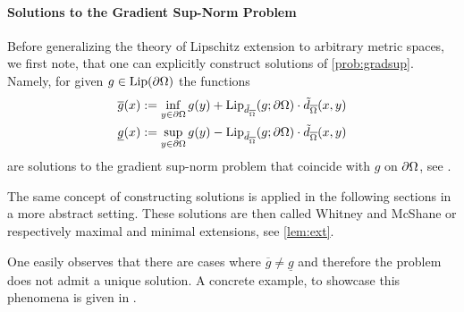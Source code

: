 \paragraph{Solutions to the Gradient Sup-Norm Problem} Before generalizing the theory of Lipschitz extension to arbitrary metric spaces, we first note, that one can explicitly construct solutions of \cref{prob:gradsup}. Namely, for given $g\in\operatorname{Lip}(\partial\Omega)$ the functions 
%
\begin{align}\label{eq:JenSol}
\begin{aligned}
\overline{g}(x) &:= \inf_{y\in\partial\domain} g(y) + 
\Lip_{\tilde{d}_{\overline{\domain}}}(g; \partial\domain)\cdot \tilde{d}_{\overline{\domain}}(x,y)\\
%
\underline{g}(x) &:= \sup_{y\in\partial\domain} g(y) - 
\Lip_{\tilde{d}_{\overline{\domain}}}(g; \partial\domain)\cdot \tilde{d}_{\overline{\domain}}(x,y)
\end{aligned}
\end{align}
%
are solutions to the gradient sup-norm problem that coincide with $g$ on $\partial\Omega$, see \cite[Th. 1.8]{jensen1993uniqueness}.
%
\begin{remark}{}{}
The same concept of constructing solutions is applied in the following sections in a more abstract setting. 
These solutions are then called Whitney and McShane or respectively maximal and minimal extensions, see 
\cref{lem:ext}.
\end{remark}
%
One easily observes that there are cases where $\overline{g}\neq \underline{g}$ and therefore the problem does not admit a unique solution. A concrete example, to showcase this phenomena is given in \cite[p. 53]{jensen1993uniqueness}.
%
%

